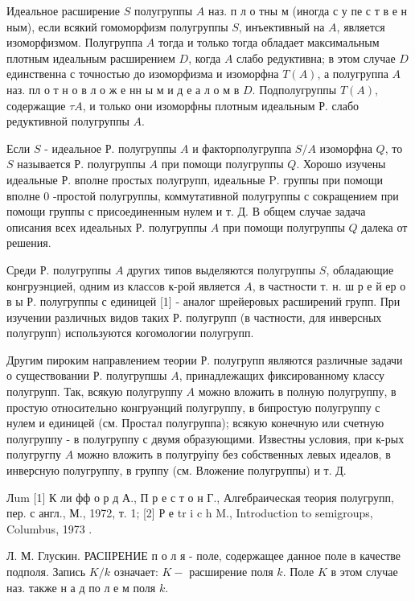 \documentclass[10pt]{article}
\begin{document}
Идеальное расширение $S$ полугруппы $A$ наз. п л о тны м (иногда с у пе с т в е н ным), если всякий гомоморфизм полугруппы $S$, инъективный на $A$, является изоморфизмом. Полугруппа $A$ тогда и только тогда обладает максимальным плотным идеальным расширением $D$, когда $A$ слабо редуктивна; в этом случае $D$ единственна с точностью до изоморфизма и изоморфна $T(A)$, а полугруппа $A$ наз. пл о т н о в л о ж е нн ы м и д е а л о м в $D$. Подполугруппы $T(A)$, содержащие $\tau A$, и только они изоморфны плотным идеальным Р. слабо редуктивной полугруппы $A$.



Если $S$ - идеальное Р. полугруппы $A$ и факторполугруппа $S / A$ изоморфна $Q$, то $S$ называется Р. полугруппы $A$ при помощи полугруппы $Q$. Хорошо изучены идеальные Р. вполне простых полугрупп, идеальные $\mathrm{P}$. группы при помощи вполне 0 -простой полугруппы, коммутативной полугруппы с сокращением при помощи группы с присоединенным нулем и т. Д. В общем случае задача описания всех идеальных Р. полугруппы $A$ при помощи полугруппы $Q$ далека от решения.



Среди Р. полугруппы $A$ других типов выделяются полугруппы $S$, обладающие конгруэнцией, одним из классов к-рой является $A$, в частности т. н. ш р е й ер о в ы Р. полугруппы с единицей [1] - аналог шрейеровых расширений групп. При изучении различных видов таких Р. полугрупп (в частности, для инверсных полугрупп) используются когомологии полугрупп.



Другим пироким направлением теории Р. полугрупп являются различные задачи о существовании Р. полугрупшы $A$, принадлежащих фиксированному классу полугрупп. Так, всякую полугруппу $A$ можно вложить в полную полугруппу, в простую относительно конгруәнций полугруппу, в бипростую полугруппу с нулем и единицей (см. Простал полугруппа); всякую конечную или счетную полугруппу - в полугруппу с двумя образующими. Известны условия, при к-рых полугругпу $A$ можно вложить в полугруіпу без собственных левых идеалов, в инверсную полугруппу, в группу (см. Вложение полугруппы) и т. Д.



Лum [1] К ли фф о р д А., П р е с т о н Г., Алгебраическая теория полугрупп, пер. с англ., М., 1972, т. 1; [2] Р е t$\mathrm{r}$ i $\mathrm{c}$ h M., Introduction to semigroups, Columbus, 1973 .



Л. М. Глускин. РАСІІРЕНИЕ п о л я - поле, содержащее данное поле в качестве подполя. Запись $K / k$ означает: $K-$ расширение поля $k$. Поле $K$ в этом случае наз. также н а д по л е м поля $k$.
\end{document}
